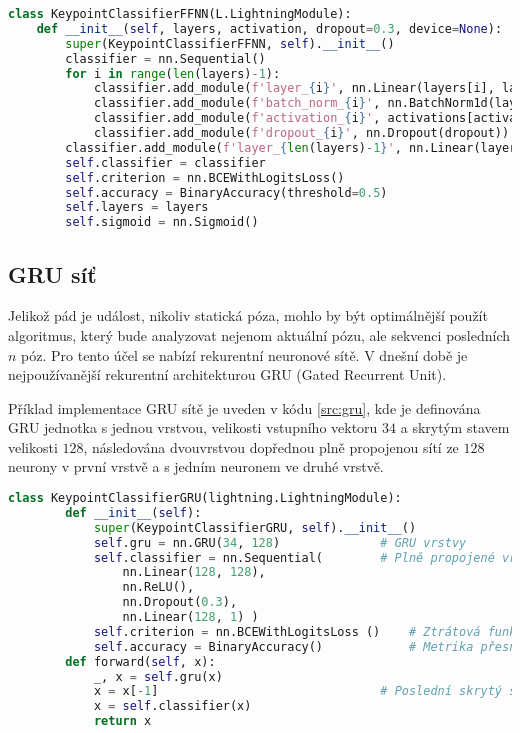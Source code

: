 \begin{lstlisting}[language=Python, label=src:ffnn_params, caption={Parametrizace konfigurace dopředné sítě}] 
class KeypointClassifierFFNN(L.LightningModule):
    def __init__(self, layers, activation, dropout=0.3, device=None):
        super(KeypointClassifierFFNN, self).__init__()        
        classifier = nn.Sequential()
        for i in range(len(layers)-1):
            classifier.add_module(f'layer_{i}', nn.Linear(layers[i], layers[i+1]))
            classifier.add_module(f'batch_norm_{i}', nn.BatchNorm1d(layers[i+1]))
            classifier.add_module(f'activation_{i}', activations[activation])
            classifier.add_module(f'dropout_{i}', nn.Dropout(dropout))
        classifier.add_module(f'layer_{len(layers)-1}', nn.Linear(layers[-1], 1))
        self.classifier = classifier
        self.criterion = nn.BCEWithLogitsLoss()
        self.accuracy = BinaryAccuracy(threshold=0.5)
        self.layers = layers
        self.sigmoid = nn.Sigmoid()   
\end{lstlisting}

\subsection{GRU síť}

Jelikož pád je událost, nikoliv statická póza, mohlo by být optimálnější použít
algoritmus, který bude analyzovat nejenom aktuální pózu, ale sekvenci
posledních $n$ póz. Pro tento účel se nabízí rekurentní neuronové sítě. V
dnešní době je nejpoužívanější rekurentní architekturou GRU (Gated Recurrent
Unit).

Příklad implementace GRU sítě je uveden v kódu \ref{src:gru}, kde je definována
GRU jednotka s jednou vrstvou, velikosti vstupního vektoru $34$ a skrytým
stavem velikosti $128$, následována dvouvrstvou dopřednou plně propojenou sítí
ze $128$ neurony v první vrstvě a s jedním neuronem ve druhé vrstvě.

\begin{lstlisting}[language=Python, label=src:gru, caption={Ukázka implementace GRU sítě v PyTorch Lightning}]
    class KeypointClassifierGRU(lightning.LightningModule):
        def __init__(self):
            super(KeypointClassifierGRU, self).__init__()
            self.gru = nn.GRU(34, 128)              # GRU vrstvy
            self.classifier = nn.Sequential(        # Plně propojené vrstvy
                nn.Linear(128, 128),
                nn.ReLU(),
                nn.Dropout(0.3),
                nn.Linear(128, 1) )
            self.criterion = nn.BCEWithLogitsLoss ()    # Ztrátová funkce
            self.accuracy = BinaryAccuracy()            # Metrika přesnosti
        def forward(self, x):
            _, x = self.gru(x)
            x = x[-1]                               # Poslední skrytý stav
            x = self.classifier(x)
            return x
    
\end{lstlisting}

